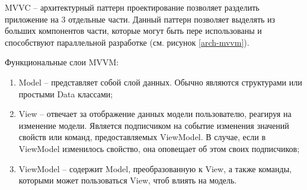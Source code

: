 MVVC – архитектурный паттерн проектирование позволяет разделить приложение на 3 отдельные части. 
Данный паттерн позволяет выделять из больших компонентов части, которые могут быть пере использованы и способствуют параллельной разработке (см. рисунок \ref{arch-mvvm}).


Функциональные слои MVVM:
\begin{enumerate}
    \item Model – представляет собой слой данных.
    Обычно являются структурами или простыми Data классами;
    \item View – отвечает за отображение данных модели пользователю, реагируя на изменение модели.
    Является подписчиком на событие изменения значений свойств или команд, предоставляемых ViewModel.
    В случае, если в ViewModel изменилось свойство, она оповещает об этом своих подписчиков;
    \item ViewModel – содержит Model, преобразованную к View, а также команды, которыми может пользоваться View, чтоб влиять на модель.
\end{enumerate}